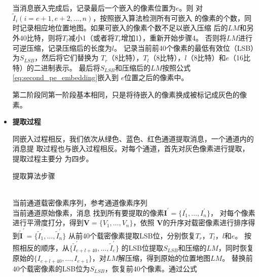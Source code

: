 \begin{itemize}
\begin{algorithm}[!h]
\begin{algorithmic}[1]
        \STATE 当消息嵌入完成后，记录最后一个嵌入的像素位置为$e$。则
        对$\tilde{I}_i (i=e+1, e+2,\dots, n)$，按照嵌入算法检测所有可嵌入
        的像素的个数，同时记录相应地位置地图。如果可嵌入的像素个数不足以嵌入压缩
        后的$LM$和另外40比特，则将$T_l$减小1（或者将$T_r$增加1），重新开始步骤4。
        否则将$LM$进行可逆压缩，记录压缩后的长度为$l$。
        \STATE 记录当前前40个像素的最低有效位（LSB）为$S_{LSB}$，然后将它们替换为
        $T_r$（8比特），$T_l$（8比特），$l$（8比特）和$e$（16比特）的二进制表示。
        最后将$S_{LSB}$和压缩后的$LM$按照公式\ref{eq:second_pe_embedding}嵌入到
        $e$位置之后的像素中。
      \end{algorithmic}
    \end{algorithm}
    \vspace{-6mm}
    \par
    第二阶段同第一阶段基本相同，只是将待嵌入的像素换成被标记成灰色的像素。
  \vspace{-3.5mm}
  \item \textbf{提取过程}
    \vspace{-2mm}
    \par
    同嵌入过程相反，我们依次从绿色、蓝色、红色通道提取消息，一个通道内的消息提
    取过程也与嵌入过程相反。对每个通道，首先对灰色像素进行提取，提取过程主要分
    为四步。
    \begin{algorithm}[!h]
      \renewcommand{\algorithmicrequire}{\textbf{输入：}}
      \renewcommand\algorithmicensure {\textbf{输出：}}
      \caption{提取算法步骤}
      \label{alg:embedding_step} 
      \begin{algorithmic}[1]
        \REQUIRE ~~\\ %
        当前通道载密像素序列，参考通道像素序列
        \ENSURE ~~\\ %
        当前通道原始像素，消息
        \vspace{2mm}
        \STATE 找到所有要提取的像素$\boldsymbol{I^{'}}=\{I_1^{'},\dots,I_n^{'}\}$，
        对每个像素进行平滑度打分，得到$\boldsymbol{V}=\{V_1,\dots,V_n\}$，依照
        $\boldsymbol{V}$的升序对载密像素进行排序得到$\boldsymbol{\tilde{I}^{'}}=
        \{\tilde{I}_1^{'},\dots,\tilde{I}_n^{'}\}$
        \STATE 从前40个载密像素提取LSB位，分别恢复$T_r$，$T_l$，$l$和$e$。
        \STATE 按照相反的顺序，从$\{\tilde{I}_{e+l+40}^{'},\dots,\tilde{I}_e^{'}\}$
        的LSB位提取$S_{LSB}$和压缩的$LM$，同时恢复原始的$\{I_{e+l+40},\dots,
        I_{e+1}\}$，对$LM$解压缩，得到原始的位置地图$LM$。
        \STATE 替换前40个载密像素的LSB位为$S_{LSB}$，恢复前40个像素。通过公式%

\end{algorithmic}
\end{algorithm}
\end{itemize}
